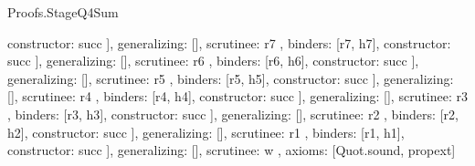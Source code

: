 \begin{lexlean}{Proofs.StageQ4Sum}
\begin{semanticmodule}
{{{{{{{{{{{{{{{{{                                                  constructor: succ
                                                }
                                              ],
                                              generalizing: [],
                                              scrutinee: r7
                                            },
                                            binders: [r7, h7],
                                            constructor: succ
                                          }
                                        ],
                                        generalizing: [],
                                        scrutinee: r6
                                      },
                                      binders: [r6, h6],
                                      constructor: succ
                                    }
                                  ],
                                  generalizing: [],
                                  scrutinee: r5
                                },
                                binders: [r5, h5],
                                constructor: succ
                              }
                            ],
                            generalizing: [],
                            scrutinee: r4
                          },
                          binders: [r4, h4],
                          constructor: succ
                        }
                      ],
                      generalizing: [],
                      scrutinee: r3
                    },
                    binders: [r3, h3],
                    constructor: succ
                  }
                ],
                generalizing: [],
                scrutinee: r2
              },
              binders: [r2, h2],
              constructor: succ
            }
          ],
          generalizing: [],
          scrutinee: r1
        },
        binders: [r1, h1],
        constructor: succ
      }
    ],
    generalizing: [],
    scrutinee: w
  },
  axioms: [Quot.sound, propext]
}


\end{semanticmodule}
\end{lexlean}
